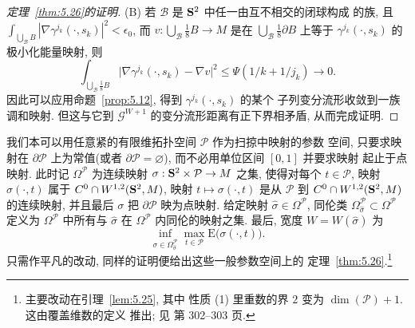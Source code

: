 \begin{proof}[定理~\ref{thm:5.26}的证明]
\medskip
\noindent (B) 若 $\mathcal{B}$ 是 $\mathbf{S}^2$ 中任一由互不相交的闭球构成
的族, 且
$\int_{\bigcup_{\mathcal{B}}B}|\nabla\gamma^{j_k}(\cdot,s_k)|^2
<\epsilon_0$, 而 $v:\bigcup_{\mathcal{B}}\frac18B\to M$ 是在
$\bigcup_{\mathcal{B}}\frac18\partial B$ 上等于
$\gamma^{j_k}(\cdot,s_k)$ 的极小化能量映射, 则
\begin{equation}
\int_{\bigcup_{\mathcal{B}}\frac18B}
\bigl|\nabla\gamma^{j_k}(\cdot,s_k)-\nabla v\bigr|^2
\leq\Psi(1/k+1/j_k)\to 0.
\label{eq:5.118}
\end{equation}
因此可以应用命题~\ref{prop:5.12}, 得到 $\gamma^{j_k}(\cdot,s_k)$ 的某个
子列变分流形收敛到一族调和映射. 但这与它到
$\mathcal{G}^{W+1}$ 的变分流形距离有正下界相矛盾, 从而完成证明.
\end{proof}

我们本可以用任意紧的有限维拓扑空间 $\mathcal{P}$ 作为扫掠中映射的参数
空间, 只要求映射在 $\partial\mathcal{P}$ 上为常值(或者
$\partial\mathcal{P}=\varnothing$), 而不必用单位区间 $[0,1]$ 并要求映射
起止于点映射. 此时记 $\Omega^{\mathcal{P}}$ 为连续映射
$\sigma:\mathbf{S}^2\times\mathcal{P}\to M$ 之集, 使得对每个
$t\in\mathcal{P}$, 映射 $\sigma(\cdot,t)$ 属于
$C^0\cap W^{1,2}(\mathbf{S}^2,M)$, 映射 $t\mapsto\sigma(\cdot,t)$ 是从
$\mathcal{P}$ 到 $C^0\cap W^{1,2}(\mathbf{S}^2,M)$ 的连续映射, 并且最后
$\sigma$ 把 $\partial\mathcal{P}$ 映为点映射. 给定映射
$\hat{\sigma}\in\Omega^{\mathcal{P}}$, 同伦类
$\Omega_{\hat{\sigma}}^{\mathcal{P}}\subset\Omega^{\mathcal{P}}$ 定义为
$\Omega^{\mathcal{P}}$ 中所有与 $\hat{\sigma}$ 在
$\Omega^{\mathcal{P}}$ 内同伦的映射之集. 最后, 宽度
$W=W(\hat{\sigma})$ 为
\begin{equation*}
\inf_{\sigma\in\Omega_{\hat{\sigma}}^{\mathcal{P}}}
\max_{t\in\mathcal{P}}\mathrm{E}\bigl(\sigma(\cdot,t)\bigr).
\end{equation*}
只需作平凡的改动, 同样的证明便给出这些一般参数空间上的
定理~\ref{thm:5.26}.\footnote{主要改动在引理~\ref{lem:5.25}, 其中
性质 (1) 里重数的界 $2$ 变为 $\dim(\mathcal{P})+1$. 这由覆盖维数的定义
推出; 见 \cite{Mu} 第 302--303 页.}

